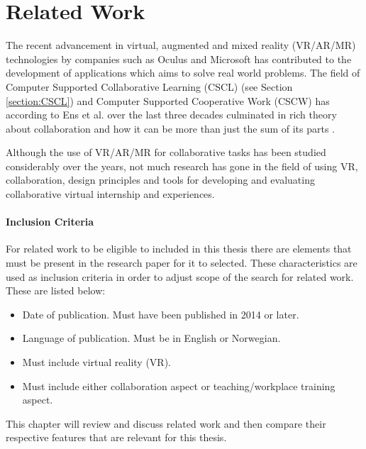 
\chapter{Related Work}
\label{chap:relatedWork}
The recent advancement in virtual, augmented and mixed reality (VR/AR/MR) technologies by companies such as Oculus and Microsoft 
has contributed to the development of applications which aims to solve real world problems. The field of Computer Supported Collaborative Learning (CSCL) (see Section \ref{section:CSCL}) and Computer Supported Cooperative Work (CSCW) has according to Ens et al. over the last three decades culminated in rich theory about collaboration and how it can be more than just the sum of its parts \cite{ens2019revisiting}.

Although the use of VR/AR/MR for collaborative tasks has been studied considerably over the years, not much research has gone in the field of using VR, collaboration, design principles and tools for developing and evaluating collaborative virtual internship and experiences. 

\subsubsection{Inclusion Criteria}
\label{section:inclusionCriteria}
For related work to be eligible to included in this thesis there are elements that must be present in the research paper for it to selected. These characteristics are used as inclusion criteria in order to adjust scope of the search for related work. These are listed below:

\begin{itemize}
\label{itm:inclusionCriteria}
\setlength\itemsep{0em}
  \item Date of publication. Must have been published in 2014 or later.
  \item Language of publication. Must be in English or Norwegian.
  \item Must include virtual reality (VR).
  \item Must include either collaboration aspect or teaching/workplace training aspect.
\end{itemize}


This chapter will review and discuss related work and then compare their respective features that are relevant for this thesis. 




